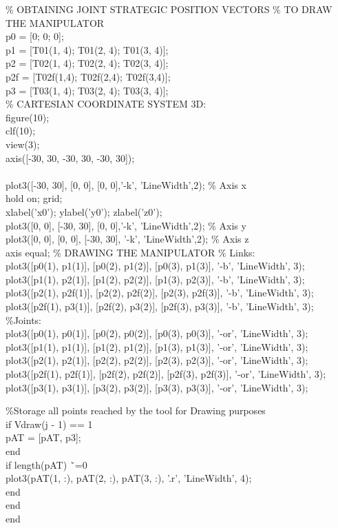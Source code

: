 \documentclass[12pt]{article}
\begin{document}
\% OBTAINING JOINT STRATEGIC POSITION VECTORS
\% TO DRAW THE MANIPULATOR
\\p0 = [0; 0; 0];
\\p1 = [T01(1, 4); T01(2, 4); T01(3, 4)];
\\p2 = [T02(1, 4); T02(2, 4); T02(3, 4)];
\\p2f = [T02f(1,4); T02f(2,4); T02f(3,4)];
\\p3 = [T03(1, 4); T03(2, 4); T03(3, 4)];
\\
\% CARTESIAN COORDINATE SYSTEM 3D:
\\figure(10);
\\clf(10);
\\view(3);
\\axis([-30, 30, -30, 30, -30, 30]);
\\
\\plot3([-30, 30], [0, 0], [0, 0],'-k', 'LineWidth',2); \% Axis x
\\hold on; grid;
\\xlabel('x0'); ylabel('y0'); zlabel('z0');
\\plot3([0, 0], [-30, 30], [0, 0],'-k', 'LineWidth',2); \% Axis y
\\plot3([0, 0], [0, 0], [-30, 30], '-k', 'LineWidth',2); \% Axis z
\\axis equal;
\% DRAWING THE MANIPULATOR
\% Links:
\\plot3([p0(1), p1(1)], [p0(2), p1(2)], [p0(3), p1(3)], '-b', 'LineWidth', 3);
\\plot3([p1(1), p2(1)], [p1(2), p2(2)], [p1(3), p2(3)], '-b', 'LineWidth', 3);
\\plot3([p2(1), p2f(1)], [p2(2), p2f(2)], [p2(3), p2f(3)], '-b', 'LineWidth', 3);
\\plot3([p2f(1), p3(1)], [p2f(2), p3(2)], [p2f(3), p3(3)], '-b', 'LineWidth', 3);
\\
\%Joints:
\\plot3([p0(1), p0(1)], [p0(2), p0(2)], [p0(3), p0(3)], '-or', 'LineWidth', 3);
\\plot3([p1(1), p1(1)], [p1(2), p1(2)], [p1(3), p1(3)], '-or', 'LineWidth', 3);
\\plot3([p2(1), p2(1)], [p2(2), p2(2)], [p2(3), p2(3)], '-or', 'LineWidth', 3);
\\plot3([p2f(1), p2f(1)], [p2f(2), p2f(2)], [p2f(3), p2f(3)], '-or', 'LineWidth', 3);
\\plot3([p3(1), p3(1)], [p3(2), p3(2)], [p3(3), p3(3)], '-or', 'LineWidth', 3);

    \%Storage all points reached by the tool for Drawing purposes  
    \\if Vdraw(j - 1) == 1
    \\    pAT = [pAT, p3];
    \\end
    \\if length(pAT) \~\ =0
    \\    plot3(pAT(1, :), pAT(2, :), pAT(3, :), '.r', 'LineWidth', 4);
    \\end %
\\end
\\end



    \label{sec:matlabcode}
    
\end{document}
